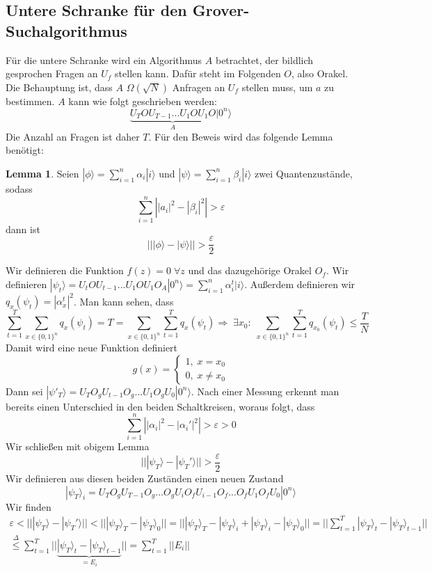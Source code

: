 \documentclass[a4paper, 12pt]{article}
\theoremstyle{plain}
\theoremstyle{definition}
\theoremstyle{lemma}
\newtheorem{lemma}[theorem]{Lemma}
\theoremstyle{remark}
\theoremstyle{example}
\begin{document}
	\subsection{Untere Schranke für den Grover-Suchalgorithmus}
	Für die untere Schranke wird ein Algorithmus $A$ betrachtet, der bildlich gesprochen Fragen an $U_f$ stellen kann. Dafür steht im Folgenden $O$, also Orakel.\\
	Die Behauptung ist, dass $A$ $\Omega(\sqrt{N})$ Anfragen an $U_f$ stellen muss, um $a$ zu bestimmen. $A$ kann wie folgt geschrieben werden: \[\underbrace{U_TOU_{T-1}...U_1OU_1O}_A|0^n\rangle\] Die Anzahl an Fragen ist daher $T$. Für den Beweis wird das folgende Lemma benötigt:
	\begin{lemma}
		Seien $|\phi\rangle = \sum_{i=1}^n \alpha_i |i\rangle$ und $|\psi\rangle = \sum_{i=1}^n \beta_i |i\rangle$ zwei Quantenzustände, sodass \[\sum_{i=1}^n \left|\left|a_i\right|^2 - \left|\beta_i\right|^2\right| > \varepsilon\] dann ist \[\left|\left||\phi\rangle - |\psi \rangle\right|\right| > \frac{\varepsilon}{2}\]
	\end{lemma}
	Wir definieren die Funktion $f(z) = 0 \; \forall z$ und das dazugehörige Orakel $O_f$. Wir definieren $|\psi_t\rangle =  U_tOU_{t-1}...U_1OU_1O_A|0^n\rangle = \sum_{i=1}^n \alpha_i^t |i\rangle$. Außerdem definieren wir $q_x(\psi_t) = \left|\alpha_x^t\right|^2$. Man kann sehen, dass \[\sum_{t=1}^{T} \sum_{x \in \{0,1\}^n} q_x(\psi_t) = T = \sum_{x \in \{0,1\}^n} \sum_{t=1}^T q_x(\psi_t) \Rightarrow \; \exists x_0: \; \sum_{x \in \{0,1\}^n} \sum_{t=1}^T q_{x_0}(\psi_t) \leq \frac{T}{N}\]
	Damit wird eine neue Funktion definiert \[g(x) = \begin{cases}
		1, \; x = x_0\\
		0, \; x \neq x_0
	\end{cases}\]
	Dann sei $|\psi'_T\rangle = U_TO_gU_{t-1}O_g...U_1O_gU_0|0^n \rangle$. Nach einer Messung erkennt man bereits einen Unterschied in den beiden Schaltkreisen, woraus folgt, dass \[\sum_{i=1}^n \left|\left|\alpha_i\right|^2 - \left|\alpha_i'\right|^2\right| > \varepsilon > 0\] Wir schließen mit obigem Lemma \[|||\psi_T\rangle - |\psi_T'\rangle|| > \frac{\varepsilon}{2}\]
	Wir definieren aus diesen beiden Zuständen einen neuen Zustand \[|\psi_T\rangle_i = U_TO_gU_{T-1}O_g ... O_gU_iO_fU_{i-1}O_f ... O_fU_1O_fU_0|0^n\rangle\]
	Wir finden \begin{eqnarray*}
		\varepsilon < |||\psi_T\rangle - |\psi_T'\rangle|| < |||\psi_T\rangle_T - |\psi_T\rangle_0|| = |||\psi_T\rangle_T - |\psi_T\rangle_i + |\psi_T\rangle_i - |\psi_T\rangle_0|| = ||\sum_{t=1}^T |\psi_T\rangle_t - |\psi_T\rangle_{t-1}||\\
		\overset{\Delta}{\leq} \sum_{t=1}^T ||\underbrace{|\psi_T\rangle_t - |\psi_T\rangle_{t-1}}_{=E_i}|| = \sum_{t=1}^T ||E_i||
	\end{eqnarray*}
\end{document}
